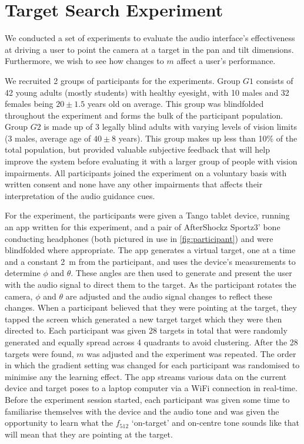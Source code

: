 \documentclass[sigconf, screen=true, anonymous=true]{acmart}
\begin{document}
\section{Target Search Experiment}\label{sec:experiments}

We conducted a set of experiments to evaluate the audio interface's effectiveness at driving a user to point the camera at a target in the pan and tilt dimensions.
Furthermore, we wish to see how changes to $m$ affect a user's performance.

We recruited 2 groups of participants for the experiments.
Group $G1$ consists of 42 young adults (mostly students) with healthy eyesight, with 10 males and 32 females being $20\pm1.5$ years old on average.
This group was blindfolded throughout the experiment and forms the bulk of the participant population.
Group $G2$ is made up of 3 legally blind adults with varying levels of vision limits (3 males, average age of $40\pm8$ years). 
This group makes up less than 10\% of the total population, but provided valuable subjective feedback that will help improve the system before evaluating it with a larger group of people with vision impairments. 
All participants joined the experiment on a voluntary basis with written consent and none have any other impairments that affects their interpretation of the audio guidance cues.

For the experiment, the participants were given a Tango tablet device, running an app written for this experiment, and a pair of AfterShockz Sportz3' bone conducting headphones (both pictured in use in \cref{fig:participant}) and were blindfolded where appropriate.
The app generates a virtual target, one at a time and a constant \SI{2}{\metre} from the participant, and uses the device's measurements to determine $\phi$ and $\theta$.
These angles are then used to generate and present the user with the audio signal to direct them to the target. 
As the participant rotates the camera, $\phi$ and $\theta$ are adjusted and the audio signal changes to reflect these changes.
When a participant believed that they were pointing at the target, they tapped the screen which generated a new target target which they were then directed to. 
Each participant was given 28 targets in total that were randomly generated and equally spread across 4 quadrants to avoid clustering. 
After the 28 targets were found, $m$ was adjusted and the experiment was repeated. 
The order in which the gradient setting was changed for each participant was randomised to minimise any the learning effect.
The app streams various data on the current device and target poses to a laptop computer via a WiFi connection in real-time. 
Before the experiment session started, each participant was given some time to familiarise themselves with the device and the audio tone and was given the opportunity to learn what the $f_{512}$ `on-target' and on-centre tone sounds like that will mean that they are pointing at the target.
\end{document}
